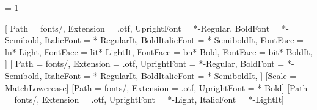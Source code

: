 
\usepackage{fontspec}
\XeTeXgenerateactualtext = 1
\usepackage[english]{babel}
\setmainfont{SourceSansPro}[
    Path = fonts/, Extension = .otf,
    UprightFont = *-Regular, BoldFont = *-Semibold, ItalicFont = *-RegularIt, BoldItalicFont = *-SemiboldIt,
    FontFace = {l}{n}{*-Light}, FontFace = {l}{it}{*-LightIt}, FontFace = {b}{n}{*-Bold}, FontFace = {b}{it}{*-BoldIt},
]
\setsansfont{SourceSansPro}[
    Path = fonts/, Extension = .otf,
    UprightFont = *-Regular, BoldFont = *-Semibold, ItalicFont = *-RegularIt, BoldItalicFont = *-SemiboldIt,
]
\setmonofont{lmmono10-regular.otf}[Scale = MatchLowercase]
\newfontfamily{}[Path = fonts/, Extension = .otf, UprightFont = *-Bold]
\newfontfamily{}[Path = fonts/, Extension = .otf, UprightFont = *-Light, ItalicFont = *-LightIt]

\usepackage[a4paper, top = 2.7cm, bottom = 2.5cm, left = 2.4cm, right = 2.4cm, headheight = 22pt, headsep = 14pt]{geometry}
\usepackage{microtype}
\usepackage{setspace}
\usepackage{ragged2e}
\usepackage[shortlabels]{enumitem}
\usepackage{multicol}
\usepackage{lastpage}
\usepackage{fancyhdr}
\usepackage{titlesec}
\usepackage{titletoc}
\usepackage{appendix}

\usepackage{graphicx}
\graphicspath{{../../images/}}
\usepackage{float}
\usepackage{caption}
\usepackage{subcaption}
\usepackage[table]{xcolor}
\usepackage{array}
\usepackage{tabularx}
\usepackage{booktabs}
\usepackage{makecell}
\usepackage{amssymb}

\usepackage{tikz}
\usetikzlibrary{positioning, calc, arrows.meta, shapes.geometric, fit, backgrounds}
\usepackage[most]{tcolorbox}

\usepackage{hyperref}
\usepackage[noabbrev, capitalise]{cleveref}
